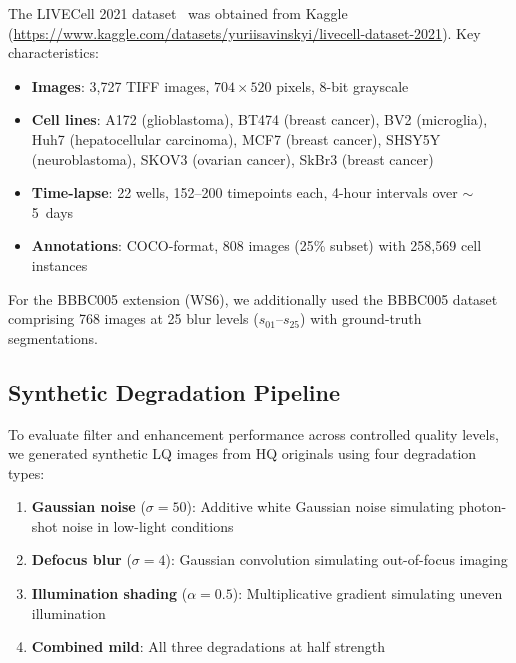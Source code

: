 \documentclass[11pt,a4paper]{article}
\begin{document}
The LIVECell 2021 dataset~\cite{edlund2021livecell} was obtained from
Kaggle (\url{https://www.kaggle.com/datasets/yuriisavinskyi/livecell-dataset-2021}).
Key characteristics:

\begin{itemize}[nosep]
    \item \textbf{Images}: 3,727 TIFF images, $704 \times 520$ pixels,
          8-bit grayscale
    \item \textbf{Cell lines}: A172 (glioblastoma), BT474 (breast cancer),
          BV2 (microglia), Huh7 (hepatocellular carcinoma), MCF7 (breast
          cancer), SHSY5Y (neuroblastoma), SKOV3 (ovarian cancer), SkBr3
          (breast cancer)
    \item \textbf{Time-lapse}: 22 wells, 152--200 timepoints each,
          4-hour intervals over $\sim$5~days
    \item \textbf{Annotations}: COCO-format, 808 images (25\% subset)
          with 258,569 cell instances
\end{itemize}

For the BBBC005 extension (WS6), we additionally used the BBBC005
dataset~\cite{ljosa2012annotated} comprising 768 images at 25 blur levels
($s_{01}$--$s_{25}$) with ground-truth segmentations.

\subsection{Synthetic Degradation Pipeline}
\label{sec:degradation}

To evaluate filter and enhancement performance across controlled quality
levels, we generated synthetic LQ images from HQ originals using four
degradation types:

\begin{enumerate}[label=\textbf{D\arabic*:},leftmargin=3em]
    \item \textbf{Gaussian noise} ($\sigma{=}50$): Additive white Gaussian
          noise simulating photon-shot noise in low-light conditions
    \item \textbf{Defocus blur} ($\sigma{=}4$): Gaussian convolution
          simulating out-of-focus imaging
    \item \textbf{Illumination shading} ($\alpha{=}0.5$): Multiplicative
          gradient simulating uneven illumination
    \item \textbf{Combined mild}: All three degradations at half strength
\end{enumerate}
\end{document}
